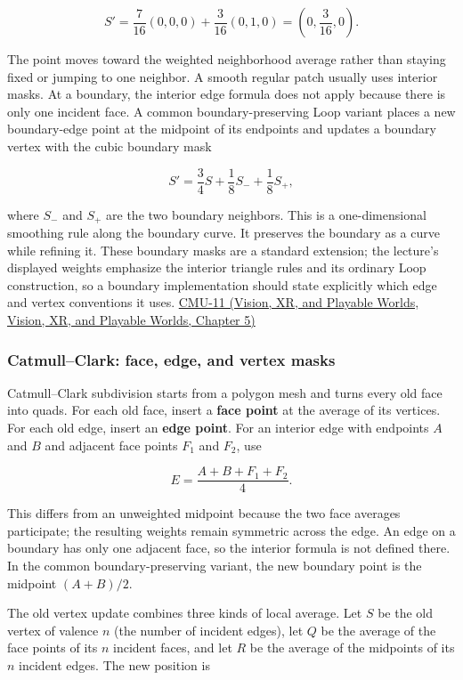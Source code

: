 \[
S'=\frac{7}{16}(0,0,0)+\frac{3}{16}(0,1,0)
=\left(0,\frac{3}{16},0\right).
\]

The point moves toward the weighted neighborhood average rather than staying fixed or jumping to one neighbor. A smooth regular patch usually uses interior masks. At a boundary, the interior edge formula does not apply because there is only one incident face. A common boundary-preserving Loop variant places a new boundary-edge point at the midpoint of its endpoints and updates a boundary vertex with the cubic boundary mask

\[
S'=\frac{3}{4}S+\frac{1}{8}S_{-}+\frac{1}{8}S_{+},
\]

where \(S_{-}\) and \(S_{+}\) are the two boundary neighbors. This is a one-dimensional smoothing rule along the boundary curve. It preserves the boundary as a curve while refining it. These boundary masks are a standard extension; the lecture's displayed weights emphasize the interior triangle rules and its ordinary Loop construction, so a boundary implementation should state explicitly which edge and vertex conventions it uses. \href{../07-Vision-XR-and-Playable-Worlds/main.pdf\#nameddest=04-visual-computing-ii-ch036-cmu-11---digital-geometry-processing}{CMU-11 (Vision, XR, and Playable Worlds, Vision, XR, and Playable Worlds, Chapter 5)}

\subsubsection{Catmull--Clark: face, edge, and vertex masks}\label{03-visual-computing-i-ch002-catmullclark-face-edge-and-vertex-masks}

Catmull--Clark subdivision starts from a polygon mesh and turns every old face into quads. For each old face, insert a \textbf{face point} at the average of its vertices. For each old edge, insert an \textbf{edge point}. For an interior edge with endpoints \(A\) and \(B\) and adjacent face points \(F_1\) and \(F_2\), use

\[
E=\frac{A+B+F_1+F_2}{4}.
\]

This differs from an unweighted midpoint because the two face averages participate; the resulting weights remain symmetric across the edge. An edge on a boundary has only one adjacent face, so the interior formula is not defined there. In the common boundary-preserving variant, the new boundary point is the midpoint \((A+B)/2\).

The old vertex update combines three kinds of local average. Let \(S\) be the old vertex of valence \(n\) (the number of incident edges), let \(Q\) be the average of the face points of its \(n\) incident faces, and let \(R\) be the average of the midpoints of its \(n\) incident edges. The new position is

